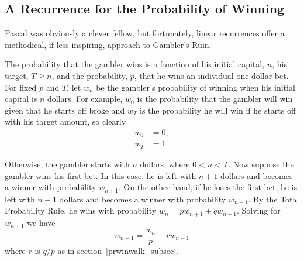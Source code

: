 \subsection{A Recurrence for the Probability of Winning}

Pascal was obviously a clever fellow, but fortunately, linear
recurrences offer a methodical, if less inspiring, approach to
Gambler's Ruin.

The probability that the gambler wins is a function of his initial
capital, $n$, his target, $T \geq n$, and the probability, $p$, that
he wins an individual one dollar bet.  For fixed $p$ and $T$, let
$w_n$ be the gambler's probability of winning when his initial
capital is $n$ dollars.  For example, $w_0$ is the probability that
the gambler will win given that he starts off broke and $w_T$ is the
probability he will win if he starts off with his target amount, so
clearly
\begin{align}
w_0 & = 0,\label{LN12:w0}\\
w_T & = 1. \label{LN12:wT}
\end{align}

Otherwise, the gambler starts with $n$ dollars, where $0 < n < T$.
Now suppose the gambler wins his first bet.  In this case, he is left
with $n+1$ dollars and becomes a winner with probability $w_{n+1}$.
On the other hand, if he loses the first bet, he is left with $n-1$
dollars and becomes a winner with probability $w_{n-1}$.  By the Total
Probability Rule, he wins with probability $w_n = p w_{n+1} + q
w_{n-1}$.  Solving for $w_{n+1}$ we have
\begin{equation}\label{LN12:rec1}
w_{n+1} = \frac{w_n}{p} - r w_{n-1}
\end{equation}
where $r$ is $q/p$ as in section~\ref{prwinwalk_subsec}.

